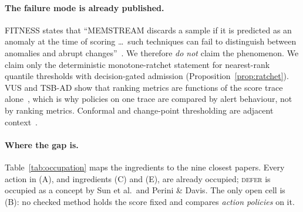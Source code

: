 \paragraph{The failure mode is already published.}
FITNESS states that ``MEMSTREAM discards a sample if it is predicted as an anomaly at
the time of scoring \ldots\ such techniques can fail to distinguish between anomalies
and abrupt changes''~\citep{sankararaman2022fitness}. We therefore \emph{do not} claim
the phenomenon. We claim only the deterministic monotone-ratchet statement for
nearest-rank quantile thresholds with decision-gated admission (Proposition~\ref{prop:ratchet}).
VUS and TSB-AD show that ranking metrics are functions of the score trace
alone~\citep{boniol2025vus, liu2024elephant}, which is why policies on one trace are
compared by alert behaviour, not by ranking metrics. Conformal and change-point
thresholding are adjacent context~\citep{xu2026conformalized, hennhofer2026nonconform}.

\paragraph{Where the gap is.}
Table~\ref{tab:occupation} maps the ingredients to the nine closest papers. Every
action in (A), and ingredients (C) and (E), are already occupied; \textsc{defer} is
occupied as a concept by Sun et al.\ and Perini \& Davis. The only open cell is (B): no
checked method holds the score fixed and compares \emph{action policies} on it.

